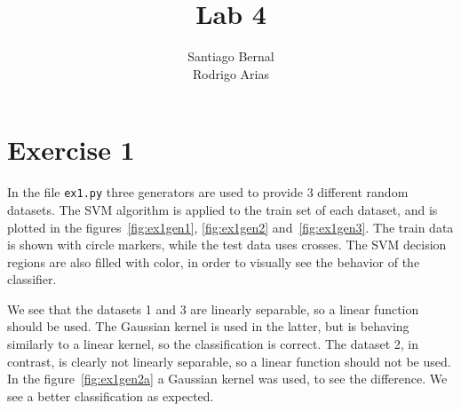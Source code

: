 \documentclass[12pt,a4paper]{article}
\title{Lab 4}
\author{Santiago Bernal \\ Rodrigo Arias}
\begin{document}
\maketitle

\section*{Exercise 1}
%
%
In the file \texttt{ex1.py} three generators are used to provide 3 different 
random datasets.
%
%
The SVM algorithm is applied to the train set of each dataset, and is plotted in 
the figures~\ref{fig:ex1gen1}, \ref{fig:ex1gen2} and~\ref{fig:ex1gen3}.
%
%
The train data is shown with circle markers, while the test data uses crosses.  
The SVM decision regions are also filled with color, in order to visually see 
the behavior of the classifier.
%
%

We see that the datasets 1 and 3 are linearly separable, so a linear function 
should be used. The Gaussian kernel is used in the latter, but is behaving 
similarly to a linear kernel, so the classification is correct. The dataset 2, 
in contrast, is clearly not linearly separable, so a linear function should not 
be used. In the figure~\ref{fig:ex1gen2a} a Gaussian kernel was used, to see the 
difference. We see a better classification as expected.
\end{document}
